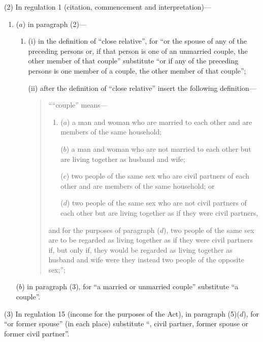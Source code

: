 \documentclass[12pt,a4paper]{article}
\begin{document}
(2) In regulation 1 (citation, commencement and interpretation)—
\begin{enumerate}\item[]
($a$) in paragraph (2)—
\begin{enumerate}\item[]
(i) in the definition of “close relative”, for “or the spouse of any of the preceding persons or, if that person is one of an unmarried couple, the other member of that couple” substitute “or if any of the preceding persons is one member of a couple, the other member of that couple”;

(ii) after the definition of “close relative” insert the following definition—
\begin{quotation}
““couple” means—
\begin{enumerate}\item[]
($a$) 
a man and woman who are married to each other and are members of the same household;

($b$) 
a man and woman who are not married to each other but are living together as husband and wife;

($c$) 
two people of the same sex who are civil partners of each other and are members of the same household; or

($d$) 
two people of the same sex who are not civil partners of each other but are living together as if they were civil partners,
\end{enumerate}
and for the purposes of paragraph ($d$), two people of the same sex are to be regarded as living together as if they were civil partners if, but only if, they would be regarded as living together as husband and wife were they instead two people of the opposite sex;”;
\end{quotation}
\end{enumerate}

($b$) in paragraph (3), for “a married or unmarried couple” substitute “a couple”.
\end{enumerate}

(3) In regulation 15 (income for the purposes of the Act), in paragraph (5)($d$), for “or former spouse” (in each place) substitute “, civil partner, former spouse or former civil partner”.
\end{document}
